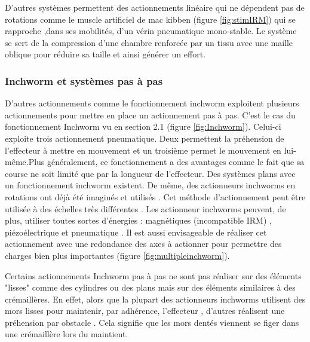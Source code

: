 \documentclass[10pt, a4paper]{article}
\begin{document}
            D'autres systèmes permettent des actionnements linéaire qui ne dépendent pas de rotations comme le muscle artificiel de mac kibben \cite{Lambert2016}\cite{Zhang2012}\cite{Daerden2002}\cite{Chou1996}\cite{Doumit2009} (figure \ref{fig:stimIRM}) qui se rapproche ,dans ses mobilités, d'un vérin pneumatique mono-stable. Le système se sert de la compression d'une chambre renforcée par un tissu avec une maille oblique pour réduire sa taille et ainsi générer un effort.
             
        \subsubsection{Inchworm et systèmes pas à pas}
        
    D'autres actionnements comme le fonctionnement inchworm exploitent plusieurs actionnements pour mettre en place un actionnement pas à pas. C'est le cas du fonctionnement Inchworm vu en section 2.1 (figure \ref{fig:Inchworm}). Celui-ci exploite trois actionnement pneumatique. Deux permettent la préhension de l'effecteur à mettre en mouvement et un troisième permet le mouvement en lui-même.Plus généralement, ce fonctionnement a des avantages comme le fait que sa course ne soit limité que par la longueur de l'effecteur. Des systèmes plans avec un fonctionnement inchworm \cite{Zhou2020} existent. De même, des actionneurs inchworms en rotations ont déjà été imaginés et utilisés \cite{Sun2015} \cite{Song2018}. Cet méthode d'actionnement peut être utilisée à des échelles très différentes \cite{Hochwallner2017}. Les actionneur inchworms peuvent, de plus, utiliser toutes sortes d'énergies : magnétiques (incompatible IRM) \cite{Zhou2020} \cite{Kim2002}, piézoélectrique \cite{Song2018} \cite{Li2005} \cite{Sun2015} et pneumatique \cite{Mark2016} \cite{Pfeil2018}. Il est aussi envisageable de réaliser cet actionnement avec une redondance des axes à actionner \cite{Landberg2017} pour permettre des charges bien plus importantes (figure \ref{fig:multipleinchworm}).
    
    Certains actionnements Inchworm pas à pas ne sont pas réaliser sur des éléments "lisses" comme des cylindres ou des plans mais sur des éléments similaires à des crémaillères. En effet, alors que la plupart des actionneurs inchworms utilisent des mors lisses pour maintenir, par adhérence, l'effecteur \cite{Pfeil2018} \cite{Song2018} \cite{Li2005} \cite{Zhou2020} \cite{Sun2015}, d'autres réalisent une préhension par obstacle \cite{Groenhuis2016} \cite{Groenhuis2016a}. Cela signifie que les mors dentés viennent se figer dans une crémaillère lors du maintient.
            
\end{document}
